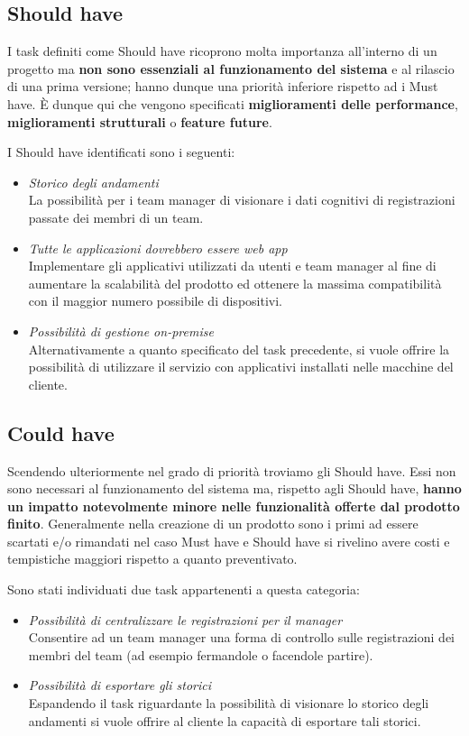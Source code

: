 \subsection{Should have}
I task definiti come Should have ricoprono molta importanza all'interno di un progetto ma {\bf non sono essenziali al funzionamento del sistema} e al rilascio di una prima versione; hanno dunque una priorità inferiore rispetto ad i Must have.\newline
È dunque qui che vengono specificati {\bf miglioramenti delle performance}, {\bf miglioramenti strutturali} o {\bf feature future}.\newline

\noindent I Should have identificati sono i seguenti:
\begin{itemize}
  \item \emph{Storico degli andamenti}\\
  {La possibilità per i team manager di visionare i dati cognitivi di registrazioni passate dei membri di un team.}
  \item \emph{Tutte le applicazioni dovrebbero essere web app}\\
  {Implementare gli applicativi utilizzati da utenti e team manager al fine di aumentare la scalabilità del prodotto ed ottenere la massima compatibilità con il maggior numero possibile di dispositivi.}
  \item \emph{Possibilità di gestione on-premise}\\
  {Alternativamente a quanto specificato del task precedente, si vuole offrire la possibilità di utilizzare il servizio con applicativi installati nelle macchine del cliente.}
\end{itemize}
\subsection{Could have}
Scendendo ulteriormente nel grado di priorità troviamo gli Should have.\newline
Essi non sono necessari al funzionamento del sistema ma, rispetto agli Should have, {\bf hanno un impatto notevolmente minore nelle funzionalità offerte dal prodotto finito}.\newline
Generalmente nella creazione di un prodotto sono i primi ad essere scartati e/o rimandati nel caso Must have e Should have si rivelino avere costi e tempistiche maggiori rispetto a quanto preventivato.\newline

\noindent Sono stati individuati due task appartenenti a questa categoria:
\begin{itemize}
  \item \emph{Possibilità di centralizzare le registrazioni per il manager}\\
  {Consentire ad un team manager una forma di controllo sulle registrazioni dei membri del team (ad esempio fermandole o facendole partire).}
  \item \emph{Possibilità di esportare gli storici}\\
  {Espandendo il task riguardante la possibilità di visionare lo storico degli andamenti si vuole offrire al cliente la capacità di esportare tali storici.}
\end{itemize}
